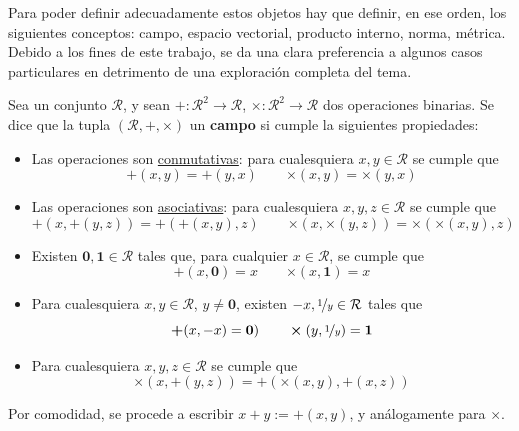 Para poder definir adecuadamente estos objetos hay que definir, en ese orden, los siguientes conceptos: campo, espacio vectorial, producto interno, norma, métrica.
%
Debido a los fines de este trabajo, se da una clara preferencia a algunos casos particulares en detrimento de una exploración completa del tema.

\begin{definicion}
Sea un conjunto $\mathcal{R}$, y sean $\boldsymbol{+} : \mathcal{R}^{2} \rightarrow \mathcal{R}$, $\boldsymbol{\times} : \mathcal{R}^{2} \rightarrow \mathcal{R}$ dos operaciones binarias. 
%
Se dice que la tupla $(\mathcal{R},\boldsymbol{+},\boldsymbol{\times})$ un \textbf{campo} si cumple la siguientes propiedades:
\begin{itemize}
\item Las operaciones son \underline{conmutativas}: para cualesquiera $x, y \in \mathcal{R}$ se cumple que 
\begin{equation*}
\boldsymbol{+}(x,y) = \boldsymbol{+}(y,x) \qquad \boldsymbol{\times}(x,y) = \boldsymbol{\times}(y,x)
\end{equation*}
\item Las operaciones son \underline{asociativas}: para cualesquiera $x, y, z \in \mathcal{R}$ se cumple que 
\begin{equation*}
\boldsymbol{+}(x,\boldsymbol{+}(y,z)) = \boldsymbol{+}(\boldsymbol{+}(x,y),z) \qquad \boldsymbol{\times}(x,\boldsymbol{\times}(y,z)) = \boldsymbol{\times}(\boldsymbol{\times}(x,y),z)
\end{equation*}
\item Existen $\boldsymbol{0}, \boldsymbol{1} \in \mathcal{R}$ tales que, para cualquier $x \in \mathcal{R}$, se cumple que
\begin{equation*}
\boldsymbol{+}(x,\boldsymbol{0}) = x \qquad \boldsymbol{\times}(x,\boldsymbol{1}) = x
\end{equation*}
\item Para cualesquiera $x, y \in \mathcal{R}$, $y \neq \boldsymbol{0}$, existen $-x, \nicefrac{1}{y} \in \mathcal{R}$ tales que
\begin{equation*}
\boldsymbol{+}(x,-x)=\boldsymbol{0}) \qquad \boldsymbol{\times}(y,\nicefrac{1}{y}) = \boldsymbol{1}
\end{equation*}
\item Para cualesquiera $x, y, z \in \mathcal{R}$ se cumple que 
\begin{equation*}
\boldsymbol{\times}(x, \boldsymbol{+}(y,z)) = \boldsymbol{+}( \boldsymbol{\times}(x,y), \boldsymbol{+}(x,z) )
\end{equation*}
\end{itemize}
Por comodidad, se procede a escribir $x+y := \boldsymbol{+}(x,y)$, y análogamente para $\boldsymbol{\times}$.
\end{definicion}

